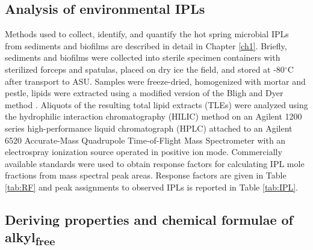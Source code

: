 \subsection{Analysis of environmental IPLs} Methods used to collect, identify, and quantify the hot spring microbial IPLs from sediments and biofilms are described in detail in Chapter \ref{ch1}. Briefly, sediments and biofilms were collected into sterile specimen containers with sterilized forceps and spatulas, placed on dry ice the field, and stored at -80$^{\circ}$C after transport to ASU. Samples were freeze-dried, homogenized with mortar and pestle, lipids were extracted using a modified version of the Bligh and Dyer method \citep{white1998signature}. Aliquots of the resulting total lipid extracts (TLEs) were analyzed using the hydrophilic interaction chromatography (HILIC) method \citep{wormer2013application} on an Agilent 1200 series high-performance liquid chromatograph (HPLC) attached to an Agilent 6520 Accurate-Mass Quadrupole Time-of-Flight Mass Spectrometer with an electrospray ionization source operated in positive ion mode. Commercially available standards were used to obtain response factors for calculating IPL mole fractions from mass spectral peak areas. Response factors are given in Table \ref{tab:RF} and peak assignments to observed IPLs is reported in Table \ref{tab:IPL}.

\subsection{Deriving properties and chemical formulae of alkyl\textsubscript{free}}

